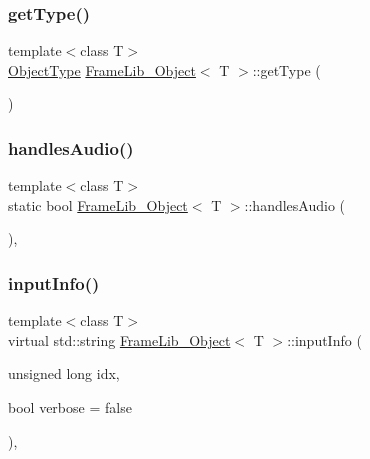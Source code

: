 \mbox{\label{class_frame_lib___object_a8e535510b8445958f5f5a95ecb11a588}} 
\subsubsection{\texorpdfstring{get\+Type()}{getType()}}
{\footnotesize\ttfamily template$<$class T$>$ \\
\hyperlink{_frame_lib___types_8h_a842c5e2e69277690b064bf363c017980}{Object\+Type} \hyperlink{class_frame_lib___object}{Frame\+Lib\+\_\+\+Object}$<$ T $>$\+::get\+Type (\begin{DoxyParamCaption}{ }\end{DoxyParamCaption})\hspace{0.3cm}{\ttfamily [inline]}}

\mbox{\label{class_frame_lib___object_a3d8517596d7598585c08af375dae79b9}} 
\subsubsection{\texorpdfstring{handles\+Audio()}{handlesAudio()}}
{\footnotesize\ttfamily template$<$class T$>$ \\
static bool \hyperlink{class_frame_lib___object}{Frame\+Lib\+\_\+\+Object}$<$ T $>$\+::handles\+Audio (\begin{DoxyParamCaption}{ }\end{DoxyParamCaption})\hspace{0.3cm}{\ttfamily [inline]}, {\ttfamily [static]}}

\mbox{\label{class_frame_lib___object_a49abea5f18125c425b1eae8710735891}} 
\subsubsection{\texorpdfstring{input\+Info()}{inputInfo()}}
{\footnotesize\ttfamily template$<$class T$>$ \\
virtual std\+::string \hyperlink{class_frame_lib___object}{Frame\+Lib\+\_\+\+Object}$<$ T $>$\+::input\+Info (\begin{DoxyParamCaption}\item[{unsigned long}]{idx,  }\item[{bool}]{verbose = {\ttfamily false} }\end{DoxyParamCaption})\hspace{0.3cm}{\ttfamily [inline]}, {\ttfamily [virtual]}}



